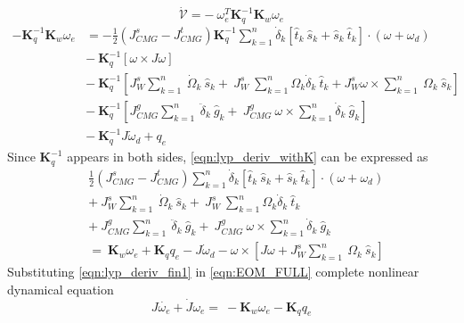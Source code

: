 \begin{equation}
\dot{\mathcal{V}} =-\ \omega ^{T}_{e}\mathbf{K}^{-1}_{q}\mathbf{K}_{w} \omega _{e}
\end{equation}
\begin{equation}
\begin{aligned}
-\mathbf{K}^{-1}_{q}\mathbf{K}_{w} \omega _{e} & =-\frac{1}{2}\left( J^{s}_{CMG} -J^{t}_{CMG}\right)\mathbf{K}^{-1}_{q}\sum ^{n}_{k=1}\dot{\delta }_{k}[\hat{t}_{k} \ \hat{s}_{k} +\hat{s}_{k} \ \hat{t}_{k}] \cdotp ( \omega +\omega _{d})\\
 & -\ \mathbf{K}^{-1}_{q}[ \omega \times J\omega ]\\
 & -\ \mathbf{K}^{-1}_{q}\left[ J^{s}_{W}\sum ^{n}_{k=1} \ \dot{\Omega }_{k} \ \hat{s}_{k} +\ J^{s}_{W} \ \sum ^{n}_{k=1} \Omega _{k}\dot{\delta }_{k} \ \hat{t}_{k} +J^{s}_{W} \omega \times \sum ^{n}_{k=1} \ \Omega _{k} \ \hat{s}_{k}\right]\\
 & -\ \mathbf{K}^{-1}_{q}\left[ J^{g}_{CMG}\sum ^{n}_{k=1} \ \ddot{\delta }_{k} \ \hat{g}_{k} +\ J^{g}_{CMG} \ \omega \times \sum ^{n}_{k=1}\dot{\delta }_{k} \ \hat{g}_{k}\right]\\
 & -\ \mathbf{K}^{-1}_{q} J\dot{\omega }_{d} +q_{e}
\end{aligned}
\label{eqn:lyp_deriv_withK}
\end{equation}
Since $\displaystyle \mathbf{K}^{-1}_{q}$ appears in both sides, \autoref{eqn:lyp_deriv_withK} can be expressed as 
\begin{equation}
\begin{aligned}
 & \frac{1}{2}\left( J^{s}_{CMG} -J^{t}_{CMG}\right)\sum ^{n}_{k=1}\dot{\delta }_{k}[\hat{t}_{k} \ \hat{s}_{k} +\hat{s}_{k} \ \hat{t}_{k}] \cdotp ( \omega +\omega _{d})\\
 & +\ J^{s}_{W}\sum ^{n}_{k=1} \ \dot{\Omega }_{k} \ \hat{s}_{k} +\ J^{s}_{W} \ \sum ^{n}_{k=1} \Omega _{k}\dot{\delta }_{k} \ \hat{t}_{k}\\
 & +\ J^{g}_{CMG}\sum ^{n}_{k=1} \ \ddot{\delta }_{k} \ \hat{g}_{k} +\ J^{g}_{CMG} \ \omega \times \sum ^{n}_{k=1}\dot{\delta }_{k} \ \hat{g}_{k}\\
 & =\ \mathbf{K}_{w} \omega _{e} +\mathbf{K}_{q} q_{e} -J\dot{\omega }_{d} -\omega \times \left[ J\omega +J^{s}_{W}\sum ^{n}_{k=1} \ \Omega _{k} \ \hat{s}_{k}\right]
\end{aligned}
\label{eqn:lyp_deriv_fin1}
\end{equation}
Substituting \autoref{eqn:lyp_deriv_fin1} in  \autoref{eqn:EOM_FULL} complete nonlinear dynamical equation
\begin{equation}
J\dot{\omega _{e}} +\dot{J} \omega _{e} =\ -\mathbf{K}_{w} \omega _{e} -\mathbf{K}_{q} q_{e}
\label{eqn:error_tracking_eom}
\end{equation}
